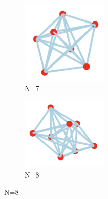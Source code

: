\documentclass[11pt,onecolumn]{article}
\begin{document}
\begin{figure}[h]
  \begin{subfigure}[b]{0.45\textwidth}
    \centering
    \includegraphics[width=0.45\textwidth]{N7.png}
    \caption{N=7}
    \label{fig:sub3}
  \end{subfigure}
  \hfill
  \begin{subfigure}[b]{0.45\textwidth}
    \centering
    \includegraphics[width=0.45\textwidth]{N8.png}
    \caption{N=8}
    \label{fig:sub4}
  \end{subfigure}

  \vspace{1em}


\end{figure}
\end{document}
